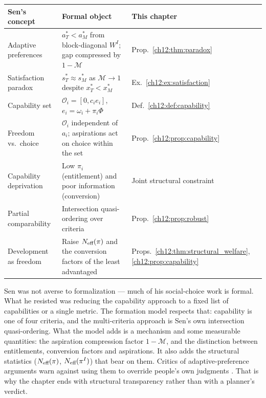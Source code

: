 \documentclass[../structural_economics_book.tex]{subfiles}
\begin{document}
\begin{center}
\begin{tabularx}{\textwidth}{LLL}
\toprule
\textbf{Sen's concept} & \textbf{Formal object} & \textbf{This chapter} \\
\midrule
Adaptive preferences & $a_T^* < a_M^*$ from block-diagonal $W^I$; gap compressed by $1 - \mathcal{M}$ & Prop.~\ref{ch12:thm:paradox} \\
Satisfaction paradox & $s_T^* \approx s_M^*$ as $\mathcal{M} \to 1$ despite $x_T^* < x_M^*$ & Ex.~\ref{ch12:ex:satisfaction} \\
Capability set & $\mathcal{O}_i = [0, c_i e_i]$, $e_i = \omega_i + \pi_i\Phi$ & Def.~\ref{ch12:def:capability} \\
Freedom vs.\ choice & $\mathcal{O}_i$ independent of $a_i$; aspirations act on choice within the set & Prop.~\ref{ch12:prop:capability} \\
Capability deprivation & Low $\pi_i$ (entitlement) and poor information (conversion) & Joint structural constraint \\
Partial comparability & Intersection quasi-ordering over criteria & Prop.~\ref{ch12:prop:robust} \\
Development as freedom & Raise $N_{\text{eff}}(\pi)$ and the conversion factors of the least advantaged & Props.~\ref{ch12:thm:structural_welfare}, \ref{ch12:prop:capability} \\
\bottomrule
\end{tabularx}
\end{center}

Sen was not averse to formalization --- much of his social-choice work is formal. What he resisted was reducing the capability approach to a fixed list of capabilities or a single metric. The formation model respects that: capability is one of four criteria, and the multi-criteria approach is Sen's own intersection quasi-ordering. What the model adds is a mechanism and some measurable quantities: the aspiration compression factor $1 - \mathcal{M}$, and the distinction between entitlements, conversion factors and aspirations. It also adds the structural statistics ($N_{\text{eff}}(\pi)$, $N_{\text{eff}}(\pi^I)$) that bear on them. Critics of adaptive-preference arguments warn against using them to override people's own judgments \citep{nussbaum2001adaptive,khader2011adaptive}. That is why the chapter ends with structural transparency rather than with a planner's verdict.


\end{document}
